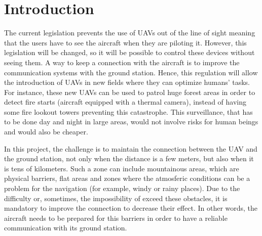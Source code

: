 \chapter{Introduction}\label{ch:intro}

The current legislation prevents the use of UAVs out of the line of sight meaning that the users have to see the aircraft when they are piloting it. However, this legislation will be changed, so it will be possible to control these devices without seeing them. A way to keep a connection with the aircraft is to improve the communication systems with the ground station. Hence, this regulation will allow the introduction of UAVs in new fields where they can optimize humans' tasks. For instance, these new UAVs can be used to patrol huge forest areas in order to detect fire starts (aircraft equipped with a thermal camera), instead of having some fire lookout towers preventing this catastrophe. This surveillance, that has to be done day and night in large areas, would not involve risks for human beings and would also be cheaper. 




In this project, the challenge is to maintain the connection between the UAV and the ground station, not only when the distance is a few meters, but also when it is tens of kilometers. Such a zone can include mountainous areas, which are physical barriers, flat areas and zones where the atmosferic conditions can be a problem for the navigation (for example, windy or rainy places). Due to the difficulty or, sometimes, the impossibility of exceed these obstacles, it is mandatory to improve the connection to decrease their effect. In other words, the aircraft needs to be prepared for this barriers in order to have a reliable communication with its ground station. 

